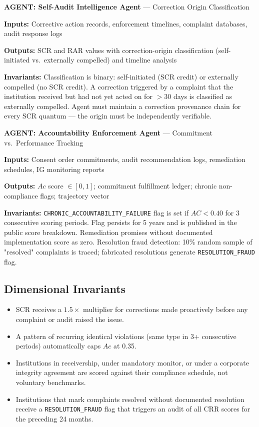 \documentclass[a4paper,11pt]{article}
\begin{document}
	\begin{agentbox}
		\textbf{\sffamily\color{navy} AGENT: Self-Audit Intelligence Agent} — Correction Origin Classification
		
		\medskip
		\textbf{Inputs:} Corrective action records, enforcement timelines, complaint databases, audit response logs
		
		\textbf{Outputs:} SCR and RAR values with correction-origin classification (self-initiated vs.\ externally compelled) and timeline analysis
		
		\textbf{Invariants:} Classification is binary: self-initiated (SCR credit) or externally compelled (no SCR credit). A correction triggered by a complaint that the institution received but had not yet acted on for $>30$ days is classified as externally compelled. Agent must maintain a correction provenance chain for every SCR quantum — the origin must be independently verifiable.
	\end{agentbox}
	
	\medskip
	
	\begin{agentbox}
		\textbf{\sffamily\color{navy} AGENT: Accountability Enforcement Agent} — Commitment vs.\ Performance Tracking
		
		\medskip
		\textbf{Inputs:} Consent order commitments, audit recommendation logs, remediation schedules, IG monitoring reports
		
		\textbf{Outputs:} $Ac$ score $\in [0,1]$; commitment fulfillment ledger; chronic non-compliance flags; trajectory vector
		
		\textbf{Invariants:} \texttt{CHRONIC\_ACCOUNTABILITY\_FAILURE} flag is set if $AC < 0.40$ for 3 consecutive scoring periods. Flag persists for 5 years and is published in the public score breakdown. Remediation promises without documented implementation score as zero. Resolution fraud detection: 10\% random sample of "resolved" complaints is traced; fabricated resolutions generate \texttt{RESOLUTION\_FRAUD} flag.
	\end{agentbox}
	
	\subsection{Dimensional Invariants}
	
	\begin{itemize}[leftmargin=1.5em]
		\item SCR receives a $1.5\times$ multiplier for corrections made proactively before any complaint or audit raised the issue.
		\item A pattern of recurring identical violations (same type in 3+ consecutive periods) automatically caps $Ac$ at 0.35.
		\item Institutions in receivership, under mandatory monitor, or under a corporate integrity agreement are scored against their compliance schedule, not voluntary benchmarks.
		\item Institutions that mark complaints resolved without documented resolution receive a \texttt{RESOLUTION\_FRAUD} flag that triggers an audit of all CRR scores for the preceding 24 months.
	\end{itemize}
	
\end{document}
